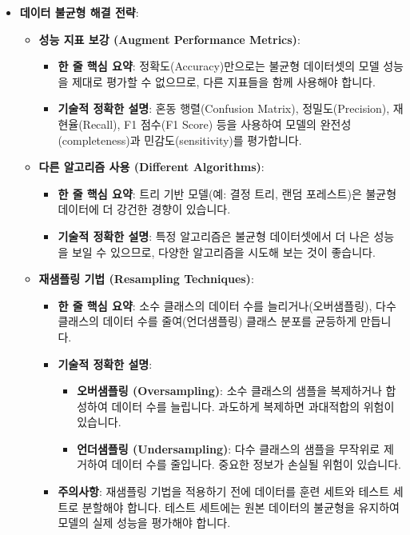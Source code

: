 \documentclass[11pt,a4paper]{article}
\theoremstyle{definition}
\begin{document}
\begin{itemize}
\begin{itemize}
\begin{itemize}
    \item \textbf{데이터 불균형 해결 전략}:
    \begin{itemize}
        \item \textbf{성능 지표 보강 (Augment Performance Metrics)}:
        \begin{itemize}
            \item \textbf{한 줄 핵심 요약}: 정확도(Accuracy)만으로는 불균형 데이터셋의 모델 성능을 제대로 평가할 수 없으므로, 다른 지표들을 함께 사용해야 합니다.
            \item \textbf{기술적 정확한 설명}: 혼동 행렬(Confusion Matrix), 정밀도(Precision), 재현율(Recall), F1 점수(F1 Score) 등을 사용하여 모델의 완전성(completeness)과 민감도(sensitivity)를 평가합니다.
        \end{itemize}
        \item \textbf{다른 알고리즘 사용 (Different Algorithms)}:
        \begin{itemize}
            \item \textbf{한 줄 핵심 요약}: 트리 기반 모델(예: 결정 트리, 랜덤 포레스트)은 불균형 데이터에 더 강건한 경향이 있습니다.
            \item \textbf{기술적 정확한 설명}: 특정 알고리즘은 불균형 데이터셋에서 더 나은 성능을 보일 수 있으므로, 다양한 알고리즘을 시도해 보는 것이 좋습니다.
        \end{itemize}
        \item \textbf{재샘플링 기법 (Resampling Techniques)}:
        \begin{itemize}
            \item \textbf{한 줄 핵심 요약}: 소수 클래스의 데이터 수를 늘리거나(오버샘플링), 다수 클래스의 데이터 수를 줄여(언더샘플링) 클래스 분포를 균등하게 만듭니다.
            \item \textbf{기술적 정확한 설명}:
            \begin{itemize}
                \item \textbf{오버샘플링 (Oversampling)}: 소수 클래스의 샘플을 복제하거나 합성하여 데이터 수를 늘립니다. 과도하게 복제하면 과대적합의 위험이 있습니다.
                \item \textbf{언더샘플링 (Undersampling)}: 다수 클래스의 샘플을 무작위로 제거하여 데이터 수를 줄입니다. 중요한 정보가 손실될 위험이 있습니다.
            \end{itemize}
            \item \textbf{주의사항}: 재샘플링 기법을 적용하기 전에 데이터를 훈련 세트와 테스트 세트로 분할해야 합니다. 테스트 세트에는 원본 데이터의 불균형을 유지하여 모델의 실제 성능을 평가해야 합니다.

\end{itemize}
\end{itemize}
\end{itemize}
\end{itemize}
\end{itemize}
\end{document}

